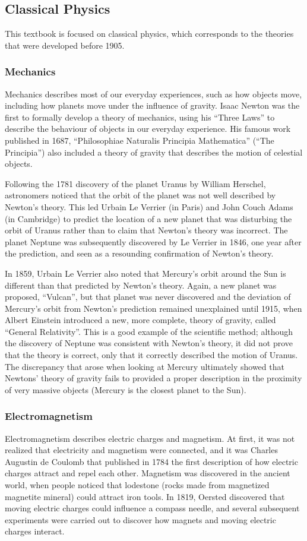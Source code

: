 \subsection{Classical Physics}
This textbook is focused on classical physics, which corresponds to the theories that were developed before 1905.
\subsubsection{Mechanics}
Mechanics describes most of our everyday experiences, such as how objects move, including how planets move under the influence of gravity. Isaac Newton was the first to formally develop a theory of mechanics, using his ``Three Laws'' to describe the behaviour of objects in our everyday experience. His famous work published in 1687, ``Philosophiae Naturalis Principia Mathematica'' (``The Principia'') also included a theory of gravity that describes the motion of celestial objects. 

Following the 1781 discovery of the planet Uranus by William Herschel, astronomers noticed that the orbit of the planet was not well described by Newton's theory. This led Urbain Le Verrier (in Paris) and John Couch Adams (in Cambridge) to predict the location of a new planet that was disturbing the orbit of Uranus rather than to claim that Newton's theory was incorrect. The planet Neptune was subsequently discovered by Le Verrier in 1846, one year after the prediction, and seen as a resounding confirmation of Newton's theory. 

In 1859, Urbain Le Verrier also noted that Mercury's orbit around the Sun is different than that predicted by Newton's theory. Again, a new planet was proposed, ``Vulcan'', but that planet was never discovered and the deviation of Mercury's orbit from Newton's prediction remained unexplained until 1915, when Albert Einstein introduced a new, more complete, theory of gravity, called ``General Relativity''. This is a good example of the scientific method; although the discovery of Neptune was consistent with Newton's theory, it did not prove that the theory is correct, only that it correctly described the motion of Uranus. The discrepancy that arose when looking at Mercury ultimately showed that Newtons' theory of gravity fails to provided a proper description in the proximity of very massive objects (Mercury is the closest planet to the Sun). 
 

\subsubsection{Electromagnetism}
Electromagnetism describes electric charges and magnetism. At first, it was not realized that electricity and magnetism were connected, and it was Charles Augustin de Coulomb that published in 1784 the first description of how electric charges attract and repel each other. Magnetism was discovered in the ancient world, when people noticed that lodestone (rocks made from magnetized magnetite mineral) could attract iron tools. In 1819, Oersted discovered that moving electric charges could influence a compass needle, and several subsequent experiments were carried out to discover how magnets and moving electric charges interact.

